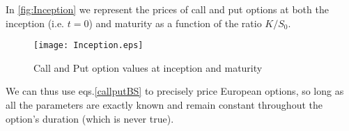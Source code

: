 In \autoref{fig:Inception} we represent the prices of call and put options at both the inception (i.e. $t=0$) and maturity as a function of the ratio $K/S_0$.
\begin{figure}[H]
    \centering
      \texttt{[image: Inception.eps]}
      \caption{Call and Put option values at inception and maturity}\label{fig:Inception}
    \end{figure}

We can thus use eqs.\eqref{callputBS} to precisely price European options, so long as all the parameters are exactly known and remain constant throughout the option's duration (which is never true).